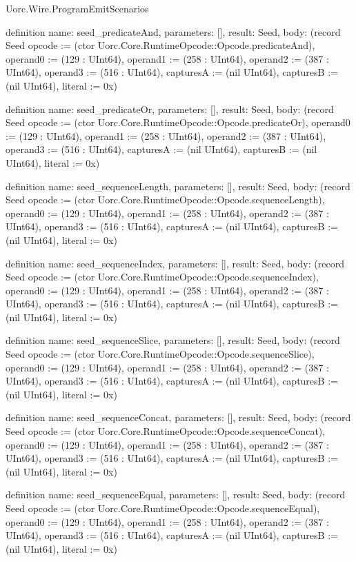 \begin{lexlean}{Uorc.Wire.ProgramEmitScenarios}
\begin{semanticmodule}
definition{
  name: seed_predicateAnd,
  parameters: [],
  result: Seed,
  body: (record Seed {opcode := (ctor Uorc.Core.RuntimeOpcode::Opcode.predicateAnd), operand0 := (129 : UInt64), operand1 := (258 : UInt64), operand2 := (387 : UInt64), operand3 := (516 : UInt64), capturesA := (nil UInt64), capturesB := (nil UInt64), literal := 0x})
}

definition{
  name: seed_predicateOr,
  parameters: [],
  result: Seed,
  body: (record Seed {opcode := (ctor Uorc.Core.RuntimeOpcode::Opcode.predicateOr), operand0 := (129 : UInt64), operand1 := (258 : UInt64), operand2 := (387 : UInt64), operand3 := (516 : UInt64), capturesA := (nil UInt64), capturesB := (nil UInt64), literal := 0x})
}

definition{
  name: seed_sequenceLength,
  parameters: [],
  result: Seed,
  body: (record Seed {opcode := (ctor Uorc.Core.RuntimeOpcode::Opcode.sequenceLength), operand0 := (129 : UInt64), operand1 := (258 : UInt64), operand2 := (387 : UInt64), operand3 := (516 : UInt64), capturesA := (nil UInt64), capturesB := (nil UInt64), literal := 0x})
}

definition{
  name: seed_sequenceIndex,
  parameters: [],
  result: Seed,
  body: (record Seed {opcode := (ctor Uorc.Core.RuntimeOpcode::Opcode.sequenceIndex), operand0 := (129 : UInt64), operand1 := (258 : UInt64), operand2 := (387 : UInt64), operand3 := (516 : UInt64), capturesA := (nil UInt64), capturesB := (nil UInt64), literal := 0x})
}

definition{
  name: seed_sequenceSlice,
  parameters: [],
  result: Seed,
  body: (record Seed {opcode := (ctor Uorc.Core.RuntimeOpcode::Opcode.sequenceSlice), operand0 := (129 : UInt64), operand1 := (258 : UInt64), operand2 := (387 : UInt64), operand3 := (516 : UInt64), capturesA := (nil UInt64), capturesB := (nil UInt64), literal := 0x})
}

definition{
  name: seed_sequenceConcat,
  parameters: [],
  result: Seed,
  body: (record Seed {opcode := (ctor Uorc.Core.RuntimeOpcode::Opcode.sequenceConcat), operand0 := (129 : UInt64), operand1 := (258 : UInt64), operand2 := (387 : UInt64), operand3 := (516 : UInt64), capturesA := (nil UInt64), capturesB := (nil UInt64), literal := 0x})
}

definition{
  name: seed_sequenceEqual,
  parameters: [],
  result: Seed,
  body: (record Seed {opcode := (ctor Uorc.Core.RuntimeOpcode::Opcode.sequenceEqual), operand0 := (129 : UInt64), operand1 := (258 : UInt64), operand2 := (387 : UInt64), operand3 := (516 : UInt64), capturesA := (nil UInt64), capturesB := (nil UInt64), literal := 0x})
}


\end{semanticmodule}
\end{lexlean}
